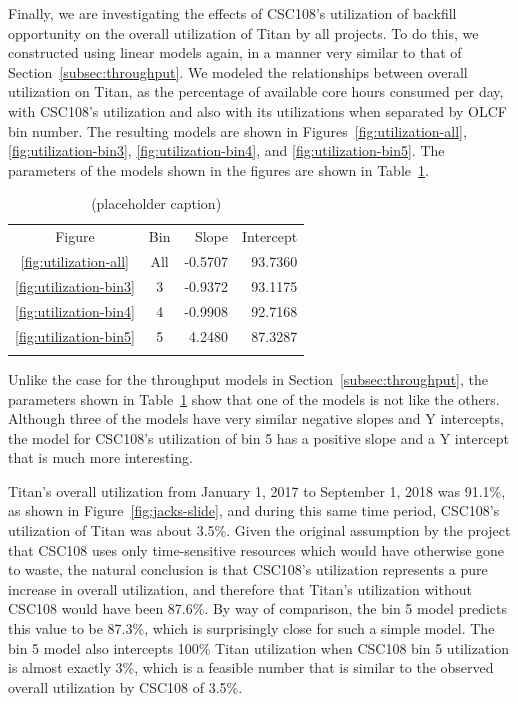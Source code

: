 Finally, we are investigating the effects of CSC108's utilization of backfill
opportunity on the overall utilization of Titan by all projects. To do this, we
constructed using linear models again, in a manner very similar to that of
Section~\ref{subsec:throughput}. We modeled the relationships between overall
utilization on Titan, as the percentage of available core hours consumed per
day, with CSC108's utilization and also with its utilizations when separated by
OLCF bin number. The resulting models are shown in
Figures~\ref{fig:utilization-all}, \ref{fig:utilization-bin3},
\ref{fig:utilization-bin4}, and \ref{fig:utilization-bin5}. The parameters of
the models shown in the figures are shown in
Table~\ref{tab:utilization-params}.

\begin{table}
\caption{(placeholder caption)}
\label{tab:utilization-params}       %
\begin{tabular}{ccrr}
\hline\noalign{\smallskip}
Figure  &   Bin & Slope   & Intercept   \\
\noalign{\smallskip}\hline\noalign{\smallskip}
\ref{fig:utilization-all}    &   All &  -0.5707 &   93.7360 \\
\ref{fig:utilization-bin3}   &   3   &  -0.9372 &   93.1175 \\
\ref{fig:utilization-bin4}   &   4   &  -0.9908 &   92.7168 \\
\ref{fig:utilization-bin5}   &   5   &  4.2480  &   87.3287 \\
\noalign{\smallskip}\hline
\end{tabular}
\end{table}

Unlike the case for the throughput models in Section~\ref{subsec:throughput},
the parameters shown in Table~\ref{tab:utilization-params} show that one of the
models is not like the others. Although three of the models have very similar
negative slopes and Y intercepts, the model for CSC108's utilization of bin 5
has a positive slope and a Y intercept that is much more interesting.

Titan's overall utilization from January 1, 2017 to September 1, 2018 was
91.1\%, as shown in Figure~\ref{fig:jacks-slide}, and during this same time
period, CSC108's utilization of Titan was about 3.5\%. Given the original
assumption by the project that CSC108 uses only time-sensitive resources which
would have otherwise gone to waste, the natural conclusion is that CSC108's
utilization represents a pure increase in overall utilization, and therefore
that Titan's utilization without CSC108 would have been 87.6\%. By way of
comparison, the bin 5 model predicts this value to be 87.3\%, which is
surprisingly close for such a simple model. The bin 5 model also intercepts
100\% Titan utilization when CSC108 bin 5 utilization is almost exactly 3\%,
which is a feasible number that is similar to the observed overall utilization
by CSC108 of 3.5\%.

